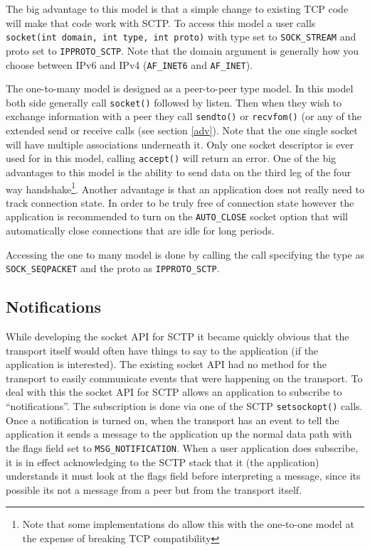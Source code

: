 \documentclass[conference]{IEEEtran}
\begin{document}
The big advantage to this model is that a simple change to 
existing TCP code will make that code work with SCTP. To access this model a user
calls \texttt{socket(int domain,  int type, int proto)}
with type set to \texttt{SOCK\_STREAM} and proto set to \texttt{IPPROTO\_SCTP}. 
Note that the domain argument is generally how you choose between IPv6 
and IPv4 (\texttt{AF\_INET6} and \texttt{AF\_INET}).

The one-to-many model is designed as a peer-to-peer type model.
In this model both side generally call \texttt{socket()} followed by listen.
Then when they wish to exchange information
with a peer they call \texttt{sendto()} or \texttt{recvfom()} (or any of the extended send or
receive calls (see section \ref{adv}). Note that the one single socket will have multiple
associations underneath it. Only one socket descriptor is ever used for
in this model, calling \texttt{accept()} will return an error.
One of the big advantages to this model is the ability to send data on the third leg
of the four way handshake\footnote{Note that some implementations do allow this with
the one-to-one model at the expense of breaking TCP compatibility}.
Another advantage is that an application does not really need to track connection state.
In order to be truly free of connection state however the application is recommended
to turn on the \texttt{AUTO\_CLOSE} socket option that will automatically close connections
that are idle for long periods. 

Accessing the one to many model is done by calling the call specifying the type as
\texttt{SOCK\_SEQPACKET} and the proto as \texttt{IPPROTO\_SCTP}.

\subsection{Notifications}

While developing the socket API for SCTP it became quickly obvious
that the transport itself would often have things to say to the application 
(if the application is interested). The existing socket API had no method
for the transport to easily communicate events that were happening
on the transport. To deal with this the socket API for SCTP allows an
application to subscribe to ``notifications''. The subscription is
done via one of the SCTP \texttt{setsockopt()} calls. Once a
notification is turned on, when the transport has an event to tell
the application it sends a message to the application up the normal
data path with the flags field set to \texttt{MSG\_NOTIFICATION}. When a
user application does subscribe, it is in effect acknowledging to the SCTP stack
that it (the application) understands it must look at the flags field before interpreting
a message, since its possible its not a message from a peer but from the transport
itself.
\end{document}
